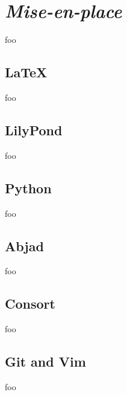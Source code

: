 \chapter{\emph{Mise-en-place}}

foo

\section{LaTeX}

foo

\section{LilyPond}

foo

\section{Python}

foo

\section{Abjad}

foo

\section{Consort}

foo

\section{Git and Vim}

foo